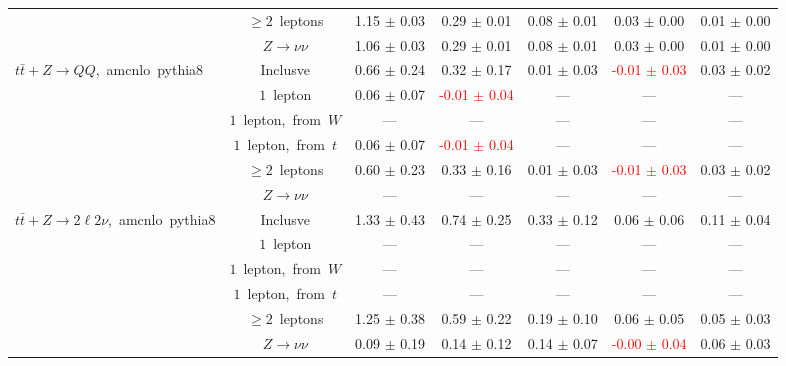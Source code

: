 \documentclass{article}
\begin{document}
\begin{longtable}{|l|c|c|c|c|c|c|}
 & $\ge2$~leptons  & 1.15 $\pm$ 0.03  & 0.29 $\pm$ 0.01  & 0.08 $\pm$ 0.01  & 0.03 $\pm$ 0.00  & 0.01 $\pm$ 0.00 \\* 
 & $Z\rightarrow\nu\nu$  & 1.06 $\pm$ 0.03  & 0.29 $\pm$ 0.01  & 0.08 $\pm$ 0.01  & 0.03 $\pm$ 0.00  & 0.01 $\pm$ 0.00 \\* 
\hline 
\multirow{6}{*}{$t\bar{t}+Z{\rightarrow}QQ$,~amcnlo~pythia8} & Inclusve  & 0.66 $\pm$ 0.24  & 0.32 $\pm$ 0.17  & 0.01 $\pm$ 0.03  & \textcolor{red}{ -0.01 $\pm$ 0.03 }  & 0.03 $\pm$ 0.02 \\* 
 & $1$~lepton  & 0.06 $\pm$ 0.07  & \textcolor{red}{ -0.01 $\pm$ 0.04 }  & ---  & ---  & --- \\* 
 & $1$~lepton,~from~$W$  & ---  & ---  & ---  & ---  & --- \\* 
 & $1$~lepton,~from~$t$  & 0.06 $\pm$ 0.07  & \textcolor{red}{ -0.01 $\pm$ 0.04 }  & ---  & ---  & --- \\* 
 & $\ge2$~leptons  & 0.60 $\pm$ 0.23  & 0.33 $\pm$ 0.16  & 0.01 $\pm$ 0.03  & \textcolor{red}{ -0.01 $\pm$ 0.03 }  & 0.03 $\pm$ 0.02 \\* 
 & $Z\rightarrow\nu\nu$  & ---  & ---  & ---  & ---  & --- \\* 
\hline 
\multirow{6}{*}{$t\bar{t}+Z{\rightarrow}2{\ell}2{\nu}$,~amcnlo~pythia8} & Inclusve  & 1.33 $\pm$ 0.43  & 0.74 $\pm$ 0.25  & 0.33 $\pm$ 0.12  & 0.06 $\pm$ 0.06  & 0.11 $\pm$ 0.04 \\* 
 & $1$~lepton  & ---  & ---  & ---  & ---  & --- \\* 
 & $1$~lepton,~from~$W$  & ---  & ---  & ---  & ---  & --- \\* 
 & $1$~lepton,~from~$t$  & ---  & ---  & ---  & ---  & --- \\* 
 & $\ge2$~leptons  & 1.25 $\pm$ 0.38  & 0.59 $\pm$ 0.22  & 0.19 $\pm$ 0.10  & 0.06 $\pm$ 0.05  & 0.05 $\pm$ 0.03 \\* 
 & $Z\rightarrow\nu\nu$  & 0.09 $\pm$ 0.19  & 0.14 $\pm$ 0.12  & 0.14 $\pm$ 0.07  & \textcolor{red}{ -0.00 $\pm$ 0.04 }  & 0.06 $\pm$ 0.03 \\* 
\hline 
\end{longtable} 

 
 
 
 
\pagebreak 

 
 
 
 
\end{document}
